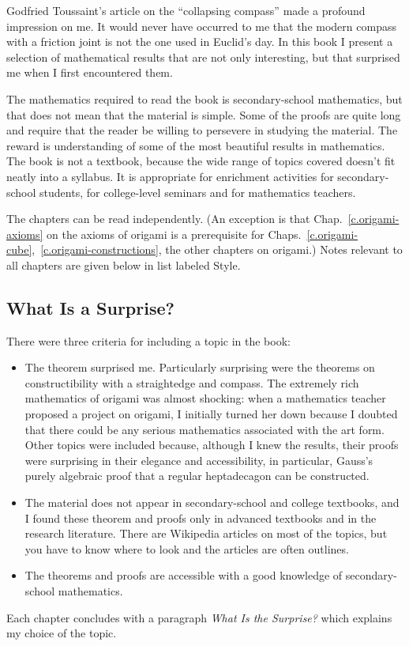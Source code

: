 \preface

Godfried Toussaint's article on the ``collapsing compass''  \cite{toussaint} made a profound impression on me. It would never have occurred to me that the modern compass with a friction joint is not the one used in Euclid's day. In this book I present a selection of mathematical results that are not only interesting, but that surprised me when I first encountered them.

The mathematics required to read the book is secondary-school mathematics, but that does not mean that the material is simple. Some of the proofs are quite long and require that the reader be willing to persevere in studying the material. The reward is understanding of some of the most beautiful results in mathematics. The book is not a textbook, because the wide range of topics covered doesn't fit neatly into a syllabus. It is appropriate for enrichment activities for secondary-school students, for college-level seminars and for mathematics teachers.

 The chapters can be read independently. (An exception is that Chap.~\ref{c.origami-axioms} on the axioms of origami is a prerequisite for Chaps.~\ref{c.origami-cube},~\ref{c.origami-constructions}, the other chapters on origami.) Notes relevant to all chapters are given below in list labeled Style.

\subsection*{What Is a Surprise?}

There were three criteria for including a topic in the book:
\begin{itemize}
\item The theorem surprised me. Particularly surprising were the theorems on constructibility with a straightedge and compass. The extremely rich mathematics of origami was almost shocking: when a mathematics teacher proposed a project on origami, I initially turned her down because I doubted that there could be any serious mathematics associated with the art form.
Other topics were included because, although I knew the results, their proofs were surprising in their elegance and accessibility, in particular, Gauss's purely algebraic proof that a regular heptadecagon can be constructed.

\item The material does not appear in secondary-school and college textbooks, and I found these theorem and proofs only in advanced textbooks and in the research literature. There are Wikipedia articles on most of the topics, but you have to know where to look and the articles are often outlines.

\item The theorems and proofs are accessible with a good knowledge of secondary-school mathematics.
\end{itemize}
Each chapter concludes with a paragraph \textit{What Is the Surprise?} which explains my choice of the topic.

